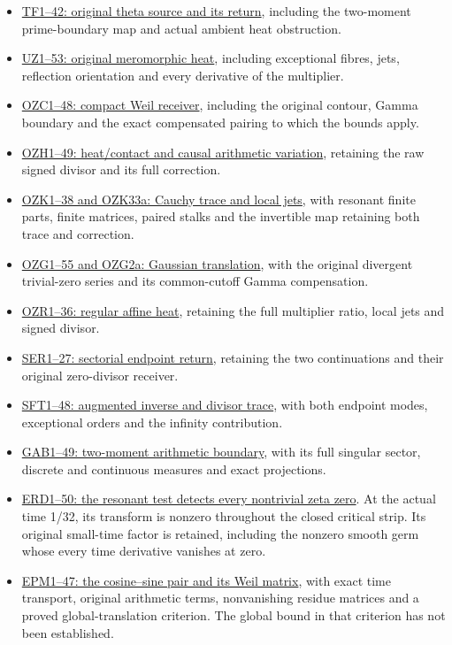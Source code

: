 \documentclass[
]{article}
\begin{document}
\begin{itemize}
\item
  \href{FAITHFUL_THETA_COMPLETION_RETURN.tex}{TF1--42: original theta
  source and its return}, including the two-moment prime-boundary map
  and actual ambient heat obstruction.
\item
  \href{FAITHFUL_UNCOMPLETED_ZETA_HEAT.tex}{UZ1--53: original
  meromorphic heat}, including exceptional fibres, jets, reflection
  orientation and every derivative of the multiplier.
\item
  \href{ORIGINAL_ZETA_COMPACT_WEIL_RECONSTRUCTION.tex}{OZC1--48: compact
  Weil receiver}, including the original contour, Gamma boundary and the
  exact compensated pairing to which the bounds apply.
\item
  \href{ORIGINAL_ZETA_HEAT_CONTACT_RECONSTRUCTION.tex}{OZH1--49:
  heat/contact and causal arithmetic variation}, retaining the raw
  signed divisor and its full correction.
\item
  \href{ORIGINAL_ZETA_CAUCHY_RECONSTRUCTION.tex}{OZK1--38 and OZK33a:
  Cauchy trace and local jets}, with resonant finite parts, finite
  matrices, paired stalks and the invertible map retaining both trace
  and correction.
\item
  \href{ORIGINAL_ZETA_GAUSSIAN_TRANSLATION_RECONSTRUCTION.tex}{OZG1--55
  and OZG2a: Gaussian translation}, with the original divergent
  trivial-zero series and its common-cutoff Gamma compensation.
\item
  \href{ORIGINAL_ZETA_REGULAR_HEAT_REMAP.tex}{OZR1--36: regular affine
  heat}, retaining the full multiplier ratio, local jets and signed
  divisor.
\item
  \href{SECTORIAL_ENDPOINT_ZERO_TRACE_RETURN.tex}{SER1--27: sectorial
  endpoint return}, retaining the two continuations and their original
  zero-divisor receiver.
\item
  \href{SECTORIAL_FILTER_TRACE_DERIVATION.tex}{SFT1--48: augmented
  inverse and divisor trace}, with both endpoint modes, exceptional
  orders and the infinity contribution.
\item
  \href{GAUSSIAN_ARITHMETIC_BOUNDARY_RETURN.tex}{GAB1--49: two-moment
  arithmetic boundary}, with its full singular sector, discrete and
  continuous measures and exact projections.
\item
  \href{ENDPOINT_RESONANT_ZERO_DETECTION.tex}{ERD1--50: the resonant
  test detects every nontrivial zeta zero}. At the actual time 1/32, its
  transform is nonzero throughout the closed critical strip. Its
  original small-time factor is retained, including the nonzero smooth
  germ whose every time derivative vanishes at zero.
\item
  \href{ENDPOINT_PAIR_TRANSPORT_AND_WEIL_MATRIX.tex}{EPM1--47: the
  cosine--sine pair and its Weil matrix}, with exact time transport,
  original arithmetic terms, nonvanishing residue matrices and a proved
  global-translation criterion. The global bound in that criterion has
  not been established.
\end{itemize}
\end{document}
